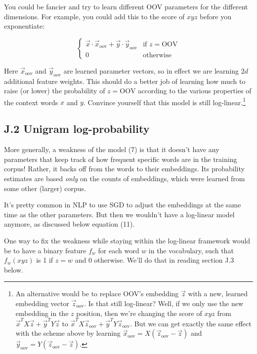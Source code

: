 \documentclass[12pt]{article}
\theoremstyle{plain}
\theoremstyle{definition}
\theoremstyle{remark}
\begin{document}
You could be fancier and try to learn different OOV parameters for the different dimensions. For example, 
you could add this to the score of $xyz$ before you exponentiate: 

\[
\begin{cases}
\vec{x}\cdot \vec{x}_{\text{oov}} + \vec{y}\cdot \vec{y}_{\text{oov}} & \text{if } z = \text{OOV} \\
0 & \text{otherwise}
\end{cases} \tag{25}
\]

Here $\vec{x}_{\text{oov}}$ and $\vec{y}_{\text{oov}}$ are learned parameter vectors, so in effect we are learning $2d$ additional feature weights. 
This should do a better job of learning how much to raise (or lower) the probability of $z = \text{OOV}$ according 
to the various properties of the context words $x$ and $y$. Convince yourself that this model is still log-linear.\footnote{An alternative would be to replace OOV’s embedding $\vec{z}$ with a new, learned embedding vector $\vec{z}_{\text{oov}}$. Is that still log-linear? Well, if we only use the new embedding in the $z$ position, then we’re changing the score of $xyz$ from $\vec{x}^TX\vec{z} + \vec{y}^TY\vec{z}$ to $\vec{x}^TX\vec{z}_{\text{oov}} + \vec{y}^TY\vec{z}_{\text{oov}}$. But we can get exactly the same effect with the scheme above by learning $\vec{x}_{\text{oov}} = X(\vec{z}_{\text{oov}} - \vec{z})$ and $\vec{y}_{\text{oov}} = Y(\vec{z}_{\text{oov}} - \vec{z})$.}

\subsection*{J.2 Unigram log-probability}

More generally, a weakness of the model (7) is that it doesn’t have any parameters that keep track of how 
frequent specific words are in the training corpus! Rather, it backs off from the words to their embeddings. 
Its probability estimates are based \emph{only} on the counts of embeddings, which were learned from some other (larger) 
corpus. 

It’s pretty common in NLP to use SGD to adjust the embeddings at the same time as the other parameters. 
But then we wouldn’t have a log-linear model anymore, as discussed below equation (11). 

One way to fix the weakness while staying within the log-linear framework would be to have a binary 
feature $f_w$ for each word $w$ in the vocabulary, such that $f_w(xyz)$ is 1 if $z=w$ and 0 otherwise. We’ll do 
that in reading section J.3 below. 
\end{document}
